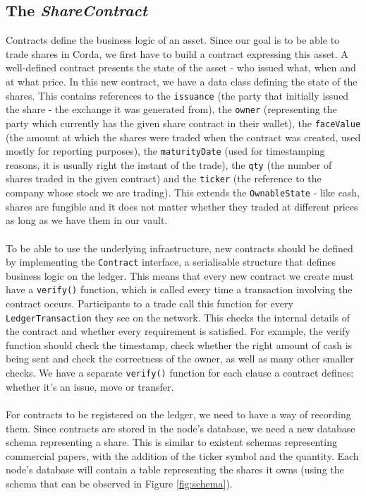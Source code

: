\documentclass[12pt,twoside]{article}
\begin{document}
\subsection{The \textit{ShareContract}}
\label{sub:Contract}
Contracts define the business logic of an asset. Since our goal is to be able to trade shares in Corda, we first have to build a contract expressing this asset. A well-defined contract presents the state of the asset - who issued what, when and at what price. In this new contract, we have a data class defining the state of the shares. This contains references to the \verb|issuance| (the party that initially issued the share - the exchange it was generated from), the \verb|owner| (representing the party which currently has the given share contract in their wallet), the \verb|faceValue| (the amount at which the shares were traded when the contract was created, used mostly for reporting purposes), the \verb|maturityDate| (used for timestamping reasons, it is usually right the instant of the trade), the \verb|qty| (the number of shares traded in the given contract) and the \verb|ticker| (the reference to the company whose stock we are trading). This extends the \verb|OwnableState| - like cash, shares are fungible and it does not matter whether they traded at different prices as long as we have them in our vault.
\\ \\
To be able to use the underlying infrastructure, new contracts should be defined by implementing the \verb|Contract| interface, a serialisable structure that defines business logic on the ledger. This means that every new contract we create must have a \verb|verify()| function, which is called every time a transaction involving the contract occurs. Participants to a trade call this function for every \verb|LedgerTransaction| they see on the network. This checks the internal details of the contract and whether every requirement is satisfied. For example, the verify function should check the timestamp, check whether the right amount of cash is being sent and check the correctness of the owner, as well as many other smaller checks. We have a separate \verb|verify()| function for each clause a contract defines: whether it's an issue, move or transfer.
\\ \\
For contracts to be registered on the ledger, we need to have a way of recording them. Since contracts are stored in the node's database, we need a new database schema representing a share. This is similar to existent schemas representing commercial papers, with the addition of the ticker symbol and the quantity. Each node's database will contain a table representing the shares it owns (using the schema that can be observed in Figure \ref{fig:schema}).
\end{document}

